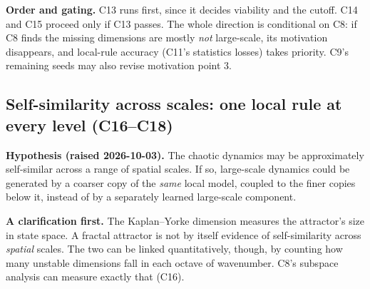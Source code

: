 \documentclass[11pt]{article}
\begin{document}
\textbf{Order and gating.} C13 runs first, since it decides viability and
the cutoff. C14 and C15 proceed only if C13 passes. The whole direction
is conditional on C8: if C8 finds the missing dimensions are mostly
\emph{not} large-scale, its motivation disappears, and local-rule
accuracy (C11's statistics losses) takes priority. C9's remaining seeds
may also revise motivation point 3.

\subsection{Self-similarity across scales: one local rule at every level (C16--C18)}
\label{sec:self_similar}

\textbf{Hypothesis (raised 2026-10-03).} The chaotic dynamics may be
approximately self-similar across a range of spatial scales. If so,
large-scale dynamics could be generated by a coarser copy of the
\emph{same} local model, coupled to the finer copies below it, instead
of by a separately learned large-scale component.

\textbf{A clarification first.} The Kaplan--Yorke dimension measures the
attractor's size in state space. A fractal attractor is not by itself
evidence of self-similarity across \emph{spatial} scales. The two can be
linked quantitatively, though, by counting how many unstable dimensions
fall in each octave of wavenumber. C8's subspace analysis can measure
exactly that (C16).
\end{document}
